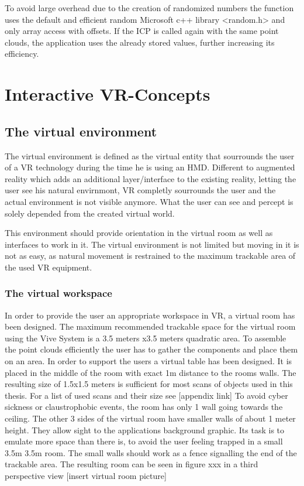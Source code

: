 \documentclass[hyperref,english,bachelorofscience,bibnum]{cgvpub}
\begin{document}
To avoid large overhead due to the creation of randomized numbers the function uses the default and efficient random Microsoft c++ library <random.h> and only array access with offsets. If the ICP is called again with the same point clouds, the application uses the already stored values, further increasing its efficiency.



\chapter{Interactive VR-Concepts}

\section{The virtual environment}

The virtual environment is defined as the virtual entity that sourrounds the user of a VR technology during the time he is using an HMD. Different to augmented reality which adds an additional layer/interface to the existing reality, letting the user see his natural envirnmont, VR completly sourrounds the user and the actual environment is not visible anymore. What the user can see and percept is solely depended from the created virtual world\cite{Milgram1995}.

This environment should provide orientation in the virtual room as well as interfaces to work in it. The virtual environment is not limited but moving in it is not as easy, as natural movement is restrained to the maximum trackable area of the used VR equipment. 

\subsection{The virtual workspace}

In order to provide the user an appropriate workspace in VR, a virtual room has been designed. The maximum recommended trackable space for the virtual room using the Vive System is a 3.5 meters x3.5 meters quadratic area.
To assemble the point clouds efficiently the user has to gather the components and place them on an area. In order to support the users a virtual table has been designed. It is placed in the middle of the room with exact 1m distance to the rooms walls. The resulting size of 1.5x1.5 meters is sufficient for most scans of objects used in this thesis. For a list of used scans and their size see [appendix link]
To avoid cyber sickness or claustrophobic events, the room has only 1 wall going towards the ceiling. The other 3 sides of the virtual room have smaller walls of about 1 meter height. They allow sight to the applications background graphic. Its task is to emulate more space than there is, to avoid the user feeling trapped in a small 3.5m 3.5m room. The small walls should work as a fence signalling the end of the trackable area. The resulting room can be seen in figure xxx in a third perspective view [insert virtual room picture]
 
\end{document}
